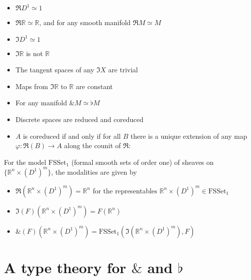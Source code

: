 \documentclass[a4paper,12pt]{article}
\newcommand{\R}{\mathbb{R}}
\newcommand{\Red}{\Re}
\newcommand{\Cored}{\Im}
\newcommand{\Wat}{\&}
\begin{document}
\begin{itemize}
\item $\Red D^1 \simeq 1$
\item $\Red \R \simeq \R$, and for any smooth manifold $\Red M \simeq M$
\item $\Cored D^1 \simeq 1$
\item $\Cored \R$ is not $\R$
\item The tangent spaces of any $\Cored X$ are trivial
\item Maps from $\Cored \R$ to $\R$ are constant
\item For any manifold $\Wat M\simeq\flat M$
\item Discrete spaces are reduced and coreduced
\item $A$ is coreduced if and only if for all $B$ there is a unique extension of any map $\varphi\colon \Red(B)\to A$ along the counit of $\Red$:
\begin{center}
\end{center}
\end{itemize}
For the model $\mathrm{FSSet}_1$ (formal smooth sets of order one) of sheaves on $\{\R^n\times (D^1)^m \}$,
the modalities are given by
\begin{itemize}
\item $\Red(\R^n\times (D^1)^m)=\R^n$ for the representables $\R^n\times (D^1)^m\in\mathrm{FSSet}_1$
\item $\Cored(F)(\R^n\times (D^1)^m)=F(\R^n)$
\item $\Wat(F)(\R^n\times (D^1)^m)=\mathrm{FSSet}_1(\Cored(\R^n\times(D^1)^m), F)$
\end{itemize}

\newpage
\section{A type theory for $\Wat$ and $\flat$}
\end{document}
